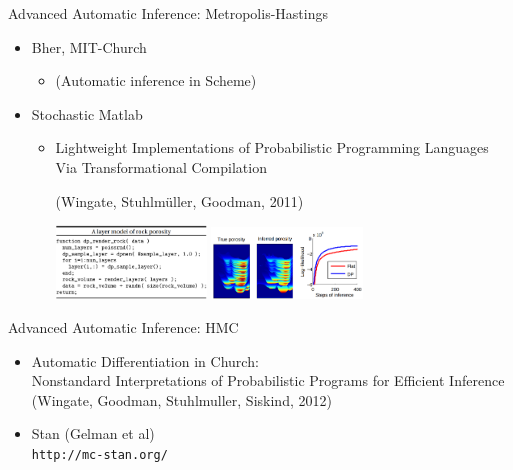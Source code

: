 
\begin{frame}{Advanced Automatic Inference: Metropolis-Hastings}
    \begin{itemize}
      \item Bher, MIT-Church
      \begin{itemize}
         \item (Automatic inference in Scheme)
      \end{itemize}      
      \item Stochastic Matlab
    \begin{itemize}
      \item Lightweight Implementations of Probabilistic Programming Languages Via Transformational Compilation {\color{DarkBlue} 
      
      (Wingate, Stuhlm\"{u}ller, Goodman, 2011)}
            \includegraphics[width=4cm]{figures/probmatlab.png}
            \includegraphics[width=4cm]{figures/probmatlab2.png}
    \end{itemize}      
    \end{itemize}
\end{frame}

\begin{frame}{Advanced Automatic Inference: HMC}

    \begin{itemize}
      \item Automatic Differentiation in Church:
      \\ Nonstandard Interpretations of Probabilistic Programs for Efficient Inference
{\color{DarkBlue} (Wingate, Goodman, Stuhlmuller, Siskind, 2012)}
      \item Stan (Gelman et al)
      \\
      \texttt{http://mc-stan.org/}
      \begin{alltt}
{\tiny
}
\end{alltt}  
      
    \end{itemize}

\end{frame}

